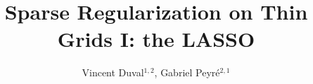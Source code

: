 \documentclass[11pt]{iopart}
\begin{document}
\title{Sparse Regularization on Thin Grids I: the LASSO} %


\author{Vincent Duval$^{1,2}$, Gabriel Peyr{\'e}$^{2,1}$}
\address{$^1$ INRIA, MOKAPLAN}
\address{$^2$ CNRS and CEREMADE, Universit\'e Paris-Dauphine}

\newcommand{\CitationProp}{TODO}












\appendix





%
%
\printbibliography
\end{document}
